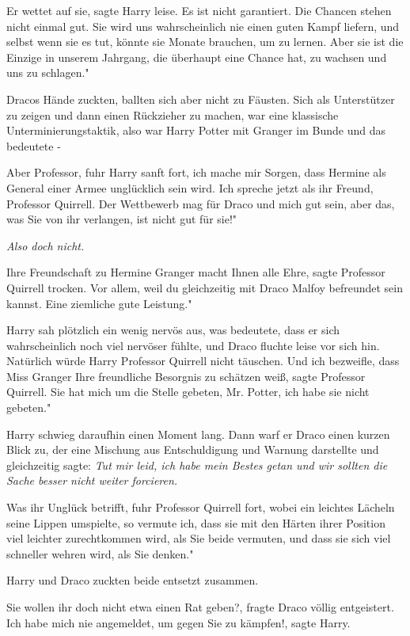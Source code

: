 \glqq{}Er wettet auf sie\grqq{}, sagte Harry leise. \glqq{}Es ist nicht
garantiert. Die Chancen stehen nicht einmal gut. Sie wird uns wahrscheinlich nie
einen guten Kampf liefern, und selbst wenn sie es tut, könnte sie Monate
brauchen, um zu lernen. Aber sie ist die Einzige in unserem Jahrgang, die
überhaupt eine Chance hat, zu wachsen und uns zu schlagen."

Dracos Hände zuckten, ballten sich aber nicht zu Fäusten. Sich als Unterstützer
zu zeigen und dann einen Rückzieher zu machen, war eine klassische
Unterminierungstaktik, also war Harry Potter mit Granger im Bunde und das
bedeutete -

\glqq{}Aber Professor\grqq{}, fuhr Harry sanft fort, \glqq{}ich mache mir Sorgen,
dass Hermine als General einer Armee unglücklich sein wird. Ich spreche jetzt
als ihr Freund, Professor Quirrell. Der Wettbewerb mag für Draco und mich gut
sein, aber das, was Sie von ihr verlangen, ist nicht gut für sie!"

\emph{Also doch nicht.}

\glqq{}Ihre Freundschaft zu Hermine Granger macht Ihnen alle Ehre\grqq{}, sagte
Professor Quirrell trocken. \glqq{}Vor allem, weil du gleichzeitig mit Draco
Malfoy befreundet sein kannst. Eine ziemliche gute Leistung."

Harry sah plötzlich ein wenig nervös aus, was bedeutete, dass er sich
wahrscheinlich noch viel nervöser fühlte, und Draco fluchte leise vor sich hin.
Natürlich würde Harry Professor Quirrell nicht täuschen. \glqq{}Und ich
bezweifle, dass Miss Granger Ihre freundliche Besorgnis zu schätzen weiß\grqq{},
sagte Professor Quirrell. \glqq{}Sie hat mich um die Stelle gebeten, Mr. Potter,
ich habe sie nicht gebeten."

Harry schwieg daraufhin einen Moment lang. Dann warf er Draco einen kurzen Blick
zu, der eine Mischung aus Entschuldigung und Warnung darstellte und gleichzeitig
sagte:
\emph{\glqq{}Tut mir leid, ich habe mein Bestes getan und wir sollten die Sache
besser nicht weiter forcieren. \glqq}

Was ihr Unglück betrifft\grqq{}, fuhr Professor Quirrell fort, wobei ein
leichtes Lächeln seine Lippen umspielte, \glqq{}so vermute ich, dass sie mit den
Härten ihrer Position viel leichter zurechtkommen wird, als Sie beide vermuten,
und dass sie sich viel schneller wehren wird, als Sie denken."

Harry und Draco zuckten beide entsetzt zusammen.

\glqq{}Sie wollen ihr doch nicht etwa einen Rat geben?\grqq{}, fragte Draco
völlig entgeistert. \glqq{}Ich habe mich nie angemeldet, um gegen Sie zu
kämpfen!\grqq{}, sagte Harry.


